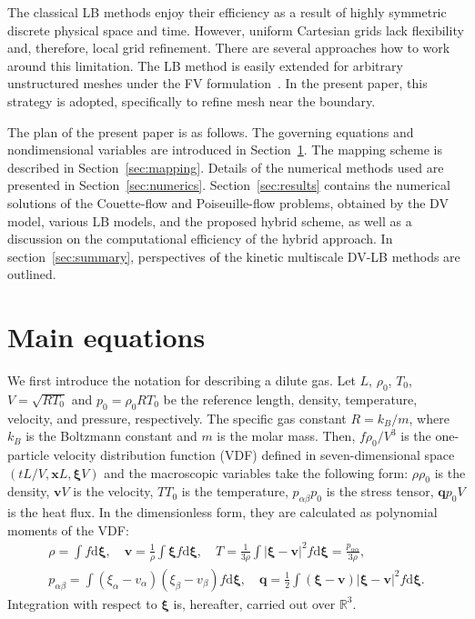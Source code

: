 \documentclass[]{elsarticle} %
\newcommand{\dd}{\mathrm{d}}
\newcommand{\dxi}{\dd{\boldsymbol{\xi}}}
\newcommand{\bxi}{\boldsymbol{\xi}}
\newcommand{\bv}{\boldsymbol{v}}
\newcommand{\bq}{\boldsymbol{q}}
\newcommand{\bx}{\boldsymbol{x}}
\newcommand{\refer}[1]{#1_0}
\begin{document}
The classical LB methods enjoy their efficiency as a result of highly symmetric discrete physical space and time.
However, uniform Cartesian grids lack flexibility and, therefore, local grid refinement.
There are several approaches how to work around this limitation.
The LB method is easily extended for arbitrary unstructured meshes
under the FV formulation~\cite{Succi1992, Peng1999, Patil2009, Li2016}.
In the present paper, this strategy is adopted, specifically to refine mesh near the boundary.

The plan of the present paper is as follows.
The governing equations and nondimensional variables are introduced in Section~\ref{sec:equations}.
The mapping scheme is described in Section~\ref{sec:mapping}.
Details of the numerical methods used are presented in Section~\ref{sec:numerics}.
Section~\ref{sec:results} contains the numerical solutions of the Couette-flow and Poiseuille-flow problems,
obtained by the DV model, various LB models, and the proposed hybrid scheme,
as well as a discussion on the computational efficiency of the hybrid approach.
In section~\ref{sec:summary}, perspectives of the kinetic multiscale DV-LB methods are outlined.

\section{Main equations}\label{sec:equations}

We first introduce the notation for describing a dilute gas.
Let \(L\), \(\refer\rho\), \(\refer{T}\), \(V = \sqrt{R\refer{T}}\) and \(\refer{p} = \refer{\rho}R\refer{T}\) be
the reference length, density, temperature, velocity, and pressure, respectively.
The specific gas constant \(R = k_B/m\), where \(k_B\) is the Boltzmann constant and \(m\) is the molar mass.
Then, \(f\refer{\rho}/V^3\) is the one-particle velocity distribution function (VDF)
defined in seven-dimensional space \((tL/V, \bx L, \bxi V)\) and
the macroscopic variables take the following form:
\(\rho\refer{\rho}\) is the density, \(\bv V\) is the velocity, \(T\refer{T}\) is the temperature,
\(p_{\alpha\beta}\refer{p}\) is the stress tensor, \(\bq\refer{p}V\) is the heat flux.
In the dimensionless form, they are calculated as polynomial moments of the VDF:
\begin{equation}\label{eq:macro}
    \begin{gathered}
    \rho = \int f \dxi, \quad
    \bv = \frac1{\rho} \int \bxi f \dxi, \quad
    T = \frac{1}{3\rho}\int|\bxi-\bv|^2f \dxi = \frac{p_{\alpha\alpha}}{3\rho}, \\
    p_{\alpha\beta} = \int(\xi_{\alpha}-v_{\alpha})(\xi_{\beta}-v_{\beta}) f \dxi, \quad
    \bq = \frac12\int(\bxi-\bv)|\bxi-\bv|^2 f \dxi.
    \end{gathered}
\end{equation}
Integration with respect to \(\bxi\) is, hereafter, carried out over \(\mathbb{R}^3\).
\end{document}
